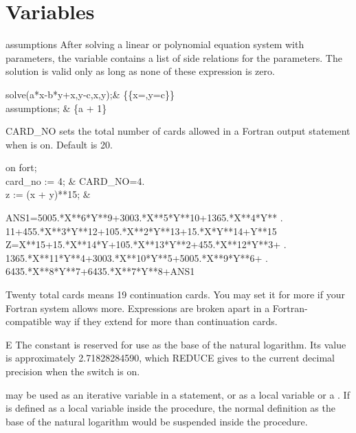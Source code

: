\section{Variables}

\begin{Variable}{assumptions}
After solving a linear or polynomial equation system
with parameters, the variable  contains a list 
of side relations for the parameters. The solution is valid only
as long as none of these expression is zero.
\begin{Examples}
solve({a*x-b*y+x,y-c},{x,y});&
\{\{x=,y=c\}\} \\
assumptions; & \{a + 1\}
\end{Examples}
\end{Variable}

\begin{Variable}{CARD\_NO}
 sets the total number of cards allowed in a Fortran
output statement when  is on.  Default is 20.

\begin{Examples}
on fort; \\
card_no := 4;                &         CARD\_NO=4. \\
z := (x + y)**15;            &
\begin{multilineoutput}{6cm}
      ANS1=5005.*X**6*Y**9+3003.*X**5*Y**10+1365.*X**4*Y**
     . 11+455.*X**3*Y**12+105.*X**2*Y**13+15.*X*Y**14+Y**15
      Z=X**15+15.*X**14*Y+105.*X**13*Y**2+455.*X**12*Y**3+ 
     . 1365.*X**11*Y**4+3003.*X**10*Y**5+5005.*X**9*Y**6+
     . 6435.*X**8*Y**7+6435.*X**7*Y**8+ANS1
\end{multilineoutput}
\end{Examples}

\begin{Comments}
Twenty total cards means 19 continuation cards.  You may set it for more
if your Fortran system allows more.  Expressions are broken apart in a
Fortran-compatible way if they extend for more than 
continuation cards.
\end{Comments}
\end{Variable}


\begin{Constant}{E}
The constant  is reserved for use as the base of the natural
logarithm.  Its value is approximately 2.71828284590, which REDUCE gives
to the current decimal precision when the switch  is on.

\begin{Comments}
 may be used as an iterative variable in a  statement,
or as a local variable or a .  If  is defined
as a local
variable inside the procedure, the normal definition as the base of the
natural logarithm would be suspended inside the procedure.
\end{Comments}
\end{Constant}


